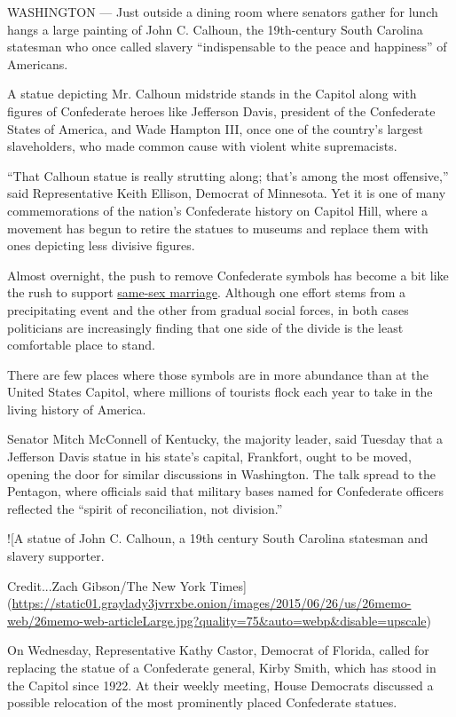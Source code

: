 WASHINGTON --- Just outside a dining room where senators gather for
lunch hangs a large painting of John C. Calhoun, the 19th-century South
Carolina statesman who once called slavery ``indispensable to the peace
and happiness'' of Americans.

A statue depicting Mr. Calhoun midstride stands in the Capitol along
with figures of Confederate heroes like Jefferson Davis, president of
the Confederate States of America, and Wade Hampton III, once one of the
country's largest slaveholders, who made common cause with violent white
supremacists.

``That Calhoun statue is really strutting along; that's among the most
offensive,'' said Representative Keith Ellison, Democrat of Minnesota.
Yet it is one of many commemorations of the nation's Confederate history
on Capitol Hill, where a movement has begun to retire the statues to
museums and replace them with ones depicting less divisive figures.

Almost overnight, the push to remove Confederate symbols has become a
bit like the rush to support
\href{http://topics.nytimes3xbfgragh.onion/top/reference/timestopics/subjects/s/same_sex_marriage/index.html?inline=nyt-classifier}{same-sex
marriage}. Although one effort stems from a precipitating event and the
other from gradual social forces, in both cases politicians are
increasingly finding that one side of the divide is the least
comfortable place to stand.

There are few places where those symbols are in more abundance than at
the United States Capitol, where millions of tourists flock each year to
take in the living history of America.

Senator Mitch McConnell of Kentucky, the majority leader, said Tuesday
that a Jefferson Davis statue in his state's capital, Frankfort, ought
to be moved, opening the door for similar discussions in Washington. The
talk spread to the Pentagon, where officials said that military bases
named for Confederate officers reflected the ``spirit of reconciliation,
not division.''

!{[}A statue of John C. Calhoun, a 19th century South Carolina statesman
and slavery supporter.

Credit...Zach Gibson/The New York
Times{]}(\url{https://static01.graylady3jvrrxbe.onion/images/2015/06/26/us/26memo-web/26memo-web-articleLarge.jpg?quality=75\&auto=webp\&disable=upscale})

On Wednesday, Representative Kathy Castor, Democrat of Florida, called
for replacing the statue of a Confederate general, Kirby Smith, which
has stood in the Capitol since 1922. At their weekly meeting, House
Democrats discussed a possible relocation of the most prominently placed
Confederate statues.

